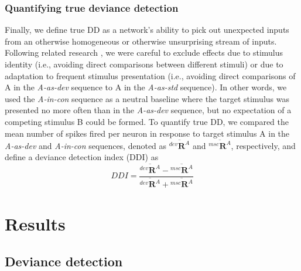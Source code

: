 \documentclass[9pt,lineno,onehalfspacing]{elife}
\newcommand{\dev}{\textit{A-as-dev}}
\newcommand{\msc}{\textit{A-in-con}}
\newcommand{\std}{\textit{A-as-std}}
\newcommand{\R}[3][]{{}^{#1}_{}\boldsymbol R^{#2}_{#3}}
\newcommand{\mean}[1]{\overline{#1}}
\begin{document}
\subsubsection{Quantifying true deviance detection}\label{sec:DDI}
Finally, we define true DD as a network's ability to pick out unexpected inputs from an otherwise homogeneous or otherwise unsurprising stream of inputs. Following related research \citep{Kubota2021-dx,Harms2014-ah,Jacobsen2001-sc}, we were careful to exclude effects due to stimulus identity (i.e., avoiding direct comparisons between different stimuli) or due to adaptation to frequent stimulus presentation (i.e., avoiding direct comparisons of A in the \dev{} sequence to A in the \std{} sequence). In other words, we used the \msc{} sequence as a neutral baseline where the target stimulus was presented no more often than in the \dev{} sequence, but no expectation of a competing stimulus B could be formed. To quantify true DD, we compared the mean number of spikes fired per neuron in response to target stimulus A in the \dev{} and \msc{} sequences, denoted as $\mean{\R[dev]{A}{}}$ and $\mean{\R[msc]{A}{}}$, respectively, and define a deviance detection index (DDI) as
\begin{equation}
    DDI = \frac{\mean{\R[dev]{A}{}} - \mean{\R[msc]{A}{}}}{\mean{\R[dev]{A}{}} + \mean{\R[msc]{A}{}}} \label{eq:ddi}
\end{equation}

\section{Results}\label{sec:results}

\subsection{Deviance detection}\label{sec:dd}
\end{document}
